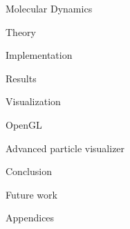 \documentclass[twoside,english, a4paper, 10pt]{uiofysmaster}
\begin{document}
\begin{part}{Molecular Dynamics}
  \begin{chapter}{Theory}
  \label{chap:md}
  
  
  
  
  
  
  \end{chapter}

  \begin{chapter}{Implementation}
  \label{chap:md_implementation}
    
    
    
    
  \end{chapter}

  \begin{chapter}{Results}
    
    
  \end{chapter}  
\end{part}

\begin{part}{Visualization}
  
  \begin{chapter}{OpenGL}
    \label{chap:opengl}
    
    
    
    
  \end{chapter}
  
  \begin{chapter}{Advanced particle visualizer}
    \label{chap:particle_visualizer}
    
    
    
    
  \end{chapter}
\end{part}

\begin{part}{Conclusion}
\begin{chapter}{Future work}

\end{chapter}
\end{part}
\begin{part}{Appendices}
\begin{appendices}





\end{appendices}
\end{part}
\printbibliography
\end{document}
